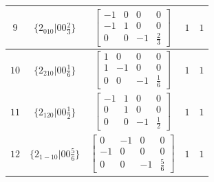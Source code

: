 \documentclass[fleqn,8pt]{jsarticle}
\begin{document}
\begin{longtable}{ccccc}
$ 9 $ & $ \{2{}_{010}|0 0 \frac{2}{3}\} $ & $ \begin{bmatrix} -1 & 0 & 0 & 0 \\ -1 & 1 & 0 & 0 \\ 0 & 0 & -1 & \frac{2}{3} \end{bmatrix} $ & $ 1 $ & $ 1 $ \\ \hline
$ 10 $ & $ \{2{}_{210}|0 0 \frac{1}{6}\} $ & $ \begin{bmatrix} 1 & 0 & 0 & 0 \\ 1 & -1 & 0 & 0 \\ 0 & 0 & -1 & \frac{1}{6} \end{bmatrix} $ & $ 1 $ & $ 1 $ \\ \hline
$ 11 $ & $ \{2{}_{120}|0 0 \frac{1}{2}\} $ & $ \begin{bmatrix} -1 & 1 & 0 & 0 \\ 0 & 1 & 0 & 0 \\ 0 & 0 & -1 & \frac{1}{2} \end{bmatrix} $ & $ 1 $ & $ 1 $ \\ \hline
$ 12 $ & $ \{2{}_{1-10}|0 0 \frac{5}{6}\} $ & $ \begin{bmatrix} 0 & -1 & 0 & 0 \\ -1 & 0 & 0 & 0 \\ 0 & 0 & -1 & \frac{5}{6} \end{bmatrix} $ & $ 1 $ & $ 1 $ \\
\end{longtable}
\end{document}
